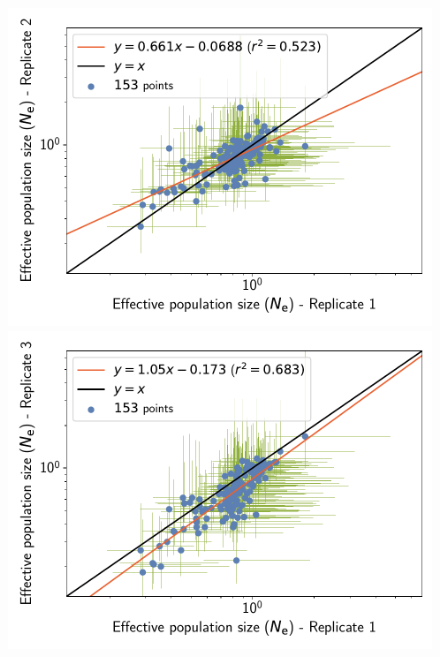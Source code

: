\documentclass{article}
\begin{document}
	\begin{figure}[H]
		\centering
		\begin{minipage}{0.32\linewidth}
			\includegraphics[width=\linewidth, page=1]{mammals/18CDS_SiteMutSelBranchNe_Rep_LogPopulationSize-1-2}
		\end{minipage} \hfill
		\begin{minipage}{0.32\linewidth}
			\includegraphics[width=\linewidth, page=1]{mammals/18CDS_SiteMutSelBranchNe_Rep_LogPopulationSize-1-3}
		\end{minipage} \hfill
		\begin{minipage}{0.32\linewidth}

\end{minipage}
\end{figure}
\end{document}
